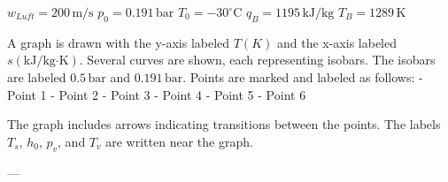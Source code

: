 \( w_{Luft} = 200 \, \text{m/s} \)  
\( p_0 = 0.191 \, \text{bar} \)  
\( T_0 = -30^\circ \text{C} \)  
\( q_B = 1195 \, \text{kJ/kg} \)  
\( T_B = 1289 \, \text{K} \)  

A graph is drawn with the y-axis labeled \( T(K) \) and the x-axis labeled \( s(\text{kJ/kg·K}) \). Several curves are shown, each representing isobars. The isobars are labeled \( 0.5 \, \text{bar} \) and \( 0.191 \, \text{bar} \). Points are marked and labeled as follows:  
- Point 1  
- Point 2  
- Point 3  
- Point 4  
- Point 5  
- Point 6  

The graph includes arrows indicating transitions between the points. The labels \( T_s \), \( h_0 \), \( p_v \), and \( T_v \) are written near the graph.

---